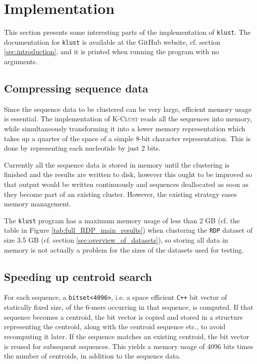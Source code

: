 \section{Implementation} \label{sec:implementation}

This section presents some interesting parts of the implementation of
\texttt{klust}. The documentation for \texttt{klust} is available at the GitHub
website, cf.  section \ref{sec:introduction}, and it is printed when running
the program with no arguments.


\subsection{Compressing sequence data}

Since the sequence data to be clustered can be very large, efficient memory
usage is essential. The implementation of \textsc{K-Clust} reads all the
sequences into memory, while simultaneously transforming it into a lower memory
representation which takes up a quarter of the space of a simple 8-bit
character representation. This is done by representing each nucleotide by just
2 bits.

Currently all the sequence data is stored in memory until the clustering is
finished and the results are written to disk, however this ought to be improved
so that output would be written continuously and sequences deallocated as soon
as they become part of an existing cluster. However, the existing strategy
eases memory management.

The \texttt{klust} program has a maximum memory usage of less than 2 GB (cf.
the table in Figure \ref{tab:full_RDP_main_results}) when clustering the
\texttt{RDP} dataset of size 3.5 GB (cf. section
\ref{sec:overview_of_datasets}), so storing all data in memory is not actually
a problem for the sizes of the datasets used for testing.


\subsection{Speeding up centroid search}

For each sequence, a \verb|bitset<4096>|, i.e. a space efficient \texttt{C++}
bit vector of statically fixed size, of the $6$-mers occurring in that
sequence, is computed. If that sequence becomes a centroid, the bit vector is
copied and stored in a structure representing the centroid, along with the
centroid sequence etc., to avoid recomputing it later. If the sequence matches
an existing centroid, the bit vector is reused for subsequent sequences. This
yields a memory usage of 4096 bits times the number of centroids, in addition
to the sequence data.

